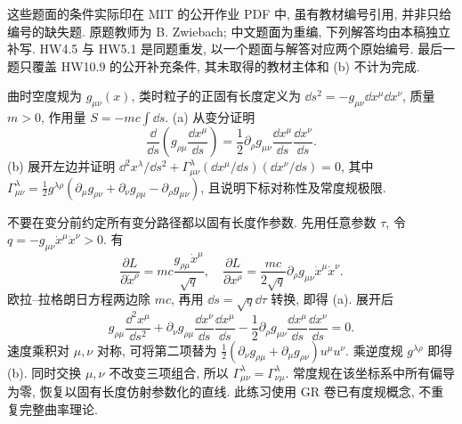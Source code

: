 这些题面的条件实际印在 MIT 的公开作业 PDF 中, 虽有教材编号引用, 并非只给编号的缺失题. 原题教师为 B. Zwiebach; 中文题面为重编, 下列解答均由本稿独立补写. HW4.5 与 HW5.1 是同题重发, 以一个题面与解答对应两个原始编号. 最后一题只覆盖 HW10.9 的公开补充条件, 其未取得的教材主体和 (b) 不计为完成.

\begin{exercise}
曲时空度规为 $g_{\mu\nu}(x)$, 类时粒子的正固有长度定义为 $\dd s^2=-g_{\mu\nu}\dd x^\mu\dd x^\nu$, 质量 $m>0$, 作用量 $S=-mc\int\dd s$.
(a) 从变分证明
\[
 \frac{\dd}{\dd s}\left(g_{\rho\mu}\frac{\dd x^\mu}{\dd s}\right)
 =\frac12\partial_\rho g_{\mu\nu}\frac{\dd x^\mu}{\dd s}\frac{\dd x^\nu}{\dd s}.
\]
(b) 展开左边并证明 $\dd^2x^\lambda/\dd s^2+\Gamma^\lambda_{\mu\nu}(\dd x^\mu/\dd s)(\dd x^\nu/\dd s)=0$, 其中
$\Gamma^\lambda_{\mu\nu}=\frac12g^{\lambda\rho}(\partial_\mu g_{\rho\nu}+\partial_\nu g_{\rho\mu}-\partial_\rho g_{\mu\nu})$, 且说明下标对称性及常度规极限.
\end{exercise}
\begin{solution}
不要在变分前约定所有变分路径都以固有长度作参数. 先用任意参数 $\tau$, 令 $q=-g_{\mu\nu}\dot x^\mu\dot x^\nu>0$. 有
\[
 \frac{\partial L}{\partial\dot x^\rho}=mc\frac{g_{\rho\mu}\dot x^\mu}{\sqrt q},
 \quad\frac{\partial L}{\partial x^\rho}=
 \frac{mc}{2\sqrt q}\partial_\rho g_{\mu\nu}\dot x^\mu\dot x^\nu.
\]
欧拉--拉格朗日方程两边除 $mc$, 再用 $\dd s=\sqrt q\dd\tau$ 转换, 即得 (a). 展开后
\[
 g_{\rho\mu}\frac{\dd^2x^\mu}{\dd s^2}
 +\partial_\nu g_{\rho\mu}\frac{\dd x^\nu}{\dd s}\frac{\dd x^\mu}{\dd s}
 -\frac12\partial_\rho g_{\mu\nu}\frac{\dd x^\mu}{\dd s}\frac{\dd x^\nu}{\dd s}=0.
\]
速度乘积对 $\mu,\nu$ 对称, 可将第二项替为
$\frac12(\partial_\nu g_{\rho\mu}+\partial_\mu g_{\rho\nu})u^\mu u^\nu$. 乘逆度规 $g^{\lambda\rho}$ 即得 (b). 同时交换 $\mu,\nu$ 不改变三项组合, 所以 $\Gamma^\lambda_{\mu\nu}=\Gamma^\lambda_{\nu\mu}$. 常度规在该坐标系中所有偏导为零, 恢复以固有长度仿射参数化的直线. 此练习使用 GR 卷已有度规概念, 不重复完整曲率理论.
\end{solution}

